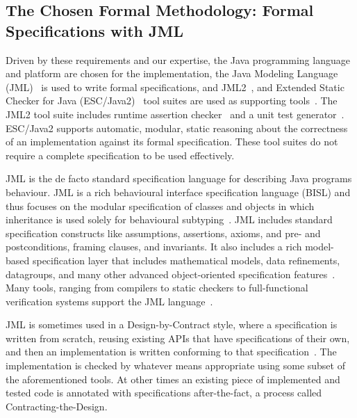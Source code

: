 \documentclass{article}
\begin{document}
\subsection{The Chosen Formal Methodology: Formal Specifications with JML}

Driven by these requirements and our expertise, the Java programming language and platform are chosen for the implementation, the Java Modeling Language (JML)~\cite{LeavensBakerRuby-Prelim} is used to write formal specifications, and JML2~\cite{JML2}, and Extended Static Checker for Java (ESC/Java2)~\cite{ESCJava2,KiniryCok04SmallCite} tool suites are used as supporting tools~\cite{BurdyEtal05-STTT}.  
The JML2 tool suite includes runtime assertion checker~\cite{Cheon-Leavens02b} and a unit test generator~\cite{Cheon2002}.
ESC/Java2 supports automatic, modular, static reasoning about the correctness of an implementation against its formal specification.
These tool suites do not require a complete specification to be used effectively.

JML is the de facto standard specification language for describing Java programs behaviour.  
JML is a rich behavioural interface specification language (BISL) and thus focuses on the modular specification of classes and objects in which inheritance is used solely for behavioural subtyping~\cite{LeavensBakerRuby99}.  
JML includes standard specification constructs like assumptions, assertions, axioms, and pre- and postconditions, framing clauses, and invariants.
It also includes a rich model-based specification layer that includes mathematical models, data refinements, datagroups, and many other advanced object-oriented specification features~\cite{Chalin06}.  
Many tools, ranging from compilers to static checkers to full-functional verification systems support the JML language~\cite{BurdyEtal05-STTT}.

JML is sometimes used in a Design-by-Contract style, where a specification is written from scratch, reusing existing APIs that have
specifications of their own, and then an implementation is written conforming to that specification~\cite{Meyer92b}.  
The implementation is checked by whatever means appropriate using some subset of the aforementioned tools.  
At other times an existing piece of implemented and tested code is annotated with specifications after-the-fact, a process called Contracting-the-Design.
\end{document}
